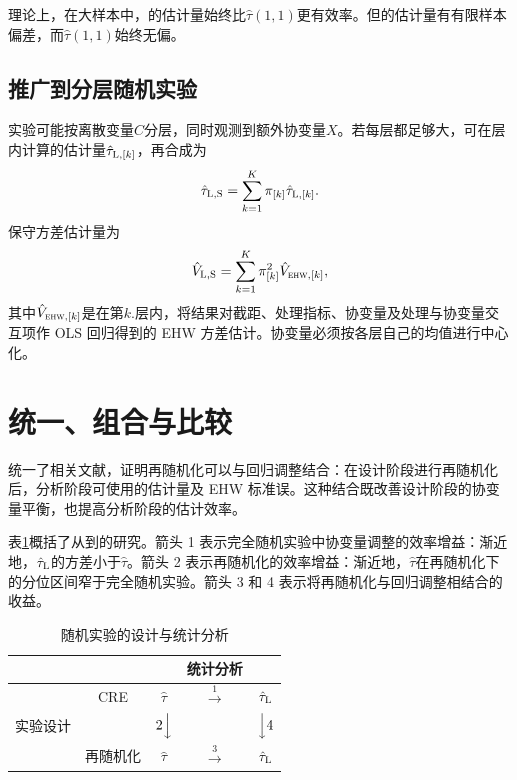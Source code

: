 理论上，在大样本中，\citet{lin2013}的估计量始终比$\hat{\tau}(1,1)$更有效率。但\citet{lin2013}的估计量有有限样本偏差，而$\hat{\tau}(1,1)$始终无偏。   





\subsection{推广到分层随机实验}\label{sec::covariate-SRE}


实验可能按离散变量$C$分层，同时观测到额外协变量$X$。若每层都足够大，可在层内计算\citet{lin2013}的估计量$\hat{\tau}_{\textsc{L},[k]}$，再合成为
$$
\hat{\tau}_{\textsc{L},\textsc{S}} = \sum_{k=1}^K \pi_{[k]} \hat{\tau}_{\textsc{L},[k]} . 
$$
保守方差估计量为
$$
\hat{V}_{\textsc{L},\textsc{S}} =  \sum_{k=1}^K \pi_{[k]}^2 \hat{V}_{\textsc{ehw},[k]},
$$
其中$\hat{V}_{\textsc{ehw},[k]}$是在第$k.$层内，将结果对截距、处理指标、协变量及处理与协变量交互项作 OLS 回归得到的 EHW 方差估计。协变量必须按各层自己的均值进行中心化。
 

\section{统一、组合与比较}
\label{sec::unification-rem-regadj}


\citet{li2019rerandomization}统一了相关文献，证明再随机化可以与回归调整结合：在设计阶段进行再随机化后，分析阶段可使用\citet{lin2013}的估计量及 EHW 标准误。这种结合既改善设计阶段的协变量平衡，也提高分析阶段的估计效率。 




表\ref{tb::rerandomization-regression}概括了从\citet{Neyman:1923}到\citet{li2019rerandomization}的研究。箭头 1 表示完全随机实验中协变量调整的效率增益：渐近地，$\hat\tau_\textsc{L}$的方差小于$\hat\tau$。箭头 2 表示再随机化的效率增益：渐近地，$\hat{\tau}$在再随机化下的分位区间窄于完全随机实验。箭头 3 和 4 表示将再随机化与回归调整相结合的收益。



\begin{table}
\centering
\caption{随机实验的设计与统计分析}\label{tb::design-analysis-2x2}
\label{tb::rerandomization-regression}
\begin{tabular}{c|cccc}
\hline 
  & & & 统计分析 & \\
  \hline 
  & CRE & $\hat\tau$ \citep{Neyman:1923} &  $\stackrel{1}{\longrightarrow}$  &  $\hat\tau_\textsc{L}$ \citep{lin2013} \\
  实验设计&  &  $2\Big\downarrow$ && $  \Big\downarrow 4$ \\
  & 再随机化 & $\hat\tau$  \citep{li2018asymptotic} &  $\stackrel{3}{\longrightarrow}$  &$\hat\tau_\textsc{L}$ \citep{li2019rerandomization}  \\
  \hline 
\end{tabular}
\end{table}



